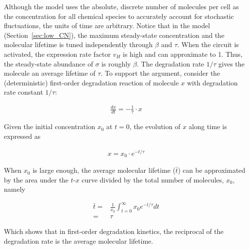 Although the model uses the absolute, discrete number of molecules
per cell as the concentration for all chemical species
to accurately account for stochastic fluctuations,
the units of time are arbitrary.
Notice that in the model (Section~\ref{sec:low_CN}),
the maximum steady-state concentration and the molecular lifetime
is tuned independently through $\beta$ and $\tau$.
When the circuit is activated, the expression rate factor $v_H$ is 
high and can approximate to 1.
Thus, the steady-state abundance of $\sigma$ is roughly $\beta$.
The degradation rate $1/\tau$ gives the molecule an average lifetime
of $\tau$. To support the argument, consider the (deterministic) first-order 
degradation reaction of molecule $x$ with degradation rate constant
$1/\tau$:

\begin{align}
    \frac{dx}{dt} = -\frac{1}{\tau}\cdot x
\end{align}

Given the initial concentration $x_0$ at $t = 0$, the evolution of $x$
along time is expressed as

\begin{align}
    x = x_0 \cdot e^{-t/\tau}
\end{align}

When $x_0$ is large enough, the average molecular lifetime ($\bar{t}$) can be 
approximated by the area under the $t$-$x$ curve divided by the
total number of molecules, $x_0$, namely

\begin{align}
    \bar{t} =& \frac{1}{x_0}\int_{t = 0}^{\infty}x_0 e^{-t/\tau}dt\\
        =& \tau
\end{align}

Which shows that in first-order degradation kinetics, the reciprocal
of the degradation rate is the average molecular lifetime.

